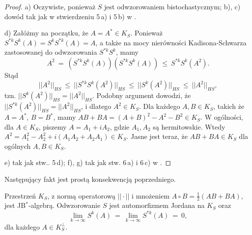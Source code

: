 {\begin{proof}
a) Oczywiste, ponieważ $S$ jest odwzorowaniem bistochastycznym;
b), c) dowód tak jak w stwierdzeniu 5\,a) i 5\,b) w \cite{olkiewicz1999environment}.

d)  Załóżmy na początku, że $A = A^{*} \in K_{S}$.
Ponieważ $S^{*k} S^{k}(A) = S^{k} S^{*k}(A) = A$,
a także na mocy nierówności Kadisona-Schwarza zastosowanej do odwzorowania
$S^{*k} S^{k}$, mamy
\begin{equation}
A^{2} \: = \: \left( S^{*k} S^{k}(A) \right) \left( S^{*k} S^{k}(A) \right)
    \: \leq \: S^{*k} S^{k}(A^{2}).
\end{equation}
Stąd
\begin{equation}
||A^{2}||_{HS} \: \leq \: || S^{*k} S^{k}(A^{2}) ||_{HS} \: \leq \:
    || S^{k}(A^{2}) ||_{HS} \: \leq \: ||A^{2}||_{HS},
\end{equation}
tzn. $|| S^{k}(A^{2}) ||_{HS} = ||A^{2}||_{HS}$.
Podobny argument dowodzi, że
$|| S^{*k}(A^{2}) ||_{HS} = ||A^{2}||_{HS}$,
i dlatego $A^{2} \in K_{S}$.
Dla każdego $A, B \in K_{S}$, takich że $A = A^{*}$, $B = B^{*}$,
mamy
$AB + BA = (A + B)^{2} - A^{2} - B^{2} \in K_{S}$.
W ogólności, dla $A \in K_{S}$, piszemy
$A = A_{1} + i A_{2}$, gdzie $A_{1}, A_{2}$ są hermitowskie.
Wtedy
$A^{2} = A_{1}^{2} - A_{2}^{2} + i(A_{1} A_{2} + A_{2} A_{1}) \in K_{S}$.
Jasne jest teraz, że $AB+BA \in K_{S}$ dla ogólnych $A,B \in K_{S}$.

e) tak jak stw.. 5\,d);
f), g) tak jak stw. 6\,a) i 6\,c) w
\cite{olkiewicz1999environment}.
\end{proof}

Następujący fakt jest prostą konsekwencją poprzedniego.

\begin{Corollary}
\label{cor:KisJordanAlgebra}
Przestrzeń $K_{S}$,
z normą operatorową $|| \cdot ||$
i mnożeniem $A \circ B = \frac{1}{2}(AB + BA)$,
jest JB$^{*}$-algebrą.
Odwzorowanie $S$ jest automorfizmem Jordana na $K_{S}$ oraz
\begin{equation}
\label{eq:SGoesTo0OnKOrth}
    \lim \limits_{k\rightarrow \infty} S^{k}(A)  \: = \:
    \lim \limits_{k\rightarrow \infty} S^{*k}(A) \: = \: 0,
\end{equation}
dla każdego $A \in K_{S}^{\perp}$.
\end{Corollary}

}
